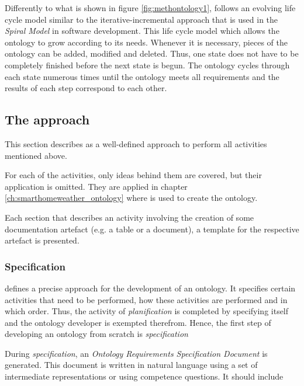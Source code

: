 Differently to what is shown in figure \ref{fig:methontology1}, \methontology follows an evolving life cycle model similar to the iterative-incremental approach that is used in the \emph{Spiral Model} in software development\cite{spiral_model}. This life cycle model which allows the ontology to grow according to its needs. Whenever it is necessary, pieces of the ontology can be added, modified and deleted. Thus, one state does not have to be completely finished before the next state is begun. The ontology cycles through each state numerous times until the ontology meets all requirements and the results of each step correspond to each other.

\subsection{The \methontology approach}
\label{sec:methontology}

This section describes \methontology as a well-defined approach to perform all activities mentioned above.

For each of the activities, only ideas behind them are covered, but their application is omitted. They are applied in chapter \ref{ch:smarthomeweather_ontology} where \methontology is used to create the \smarthomeweather ontology.

Each section that describes an activity involving the creation of some documentation artefact (e.g. a table or a document), a template for the respective artefact is presented.

\subsubsection{Specification}
\label{subsec:methontology_specification}

\methontology defines a precise approach for the development of an ontology. It specifies certain activities that need to be performed, how these activities are performed and in which order. Thus, the activity of \emph{planification} is completed by specifying \methontology itself and the ontology developer is exempted therefrom. Hence, the first step of developing an ontology from scratch is \emph{specification}

During \emph{specification}, an \emph{Ontology Requirements Specification Document} is generated. This document is written in natural language using a set of intermediate representations or using competence questions. It should include

